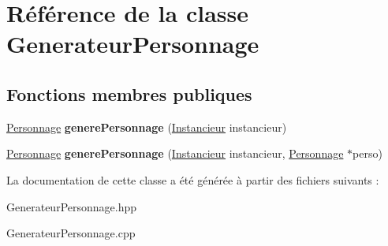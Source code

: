 \hypertarget{classGenerateurPersonnage}{\section{Référence de la classe Generateur\-Personnage}
\label{classGenerateurPersonnage}
}
\subsection*{Fonctions membres publiques}
\begin{DoxyCompactItemize}
\item 
\hypertarget{classGenerateurPersonnage_af62f2f136100c9b47a0791f4e45568ad}{\hyperlink{classPersonnage}{Personnage} {\bfseries genere\-Personnage} (\hyperlink{classInstancieur}{Instancieur} instancieur)}\label{classGenerateurPersonnage_af62f2f136100c9b47a0791f4e45568ad}

\item 
\hypertarget{classGenerateurPersonnage_ab683ba53f5fccbba40e22ca656afe81d}{\hyperlink{classPersonnage}{Personnage} {\bfseries genere\-Personnage} (\hyperlink{classInstancieur}{Instancieur} instancieur, \hyperlink{classPersonnage}{Personnage} $\ast$perso)}\label{classGenerateurPersonnage_ab683ba53f5fccbba40e22ca656afe81d}

\end{DoxyCompactItemize}


La documentation de cette classe a été générée à partir des fichiers suivants \-:\begin{DoxyCompactItemize}
\item 
Generateur\-Personnage.\-hpp\item 
Generateur\-Personnage.\-cpp\end{DoxyCompactItemize}
